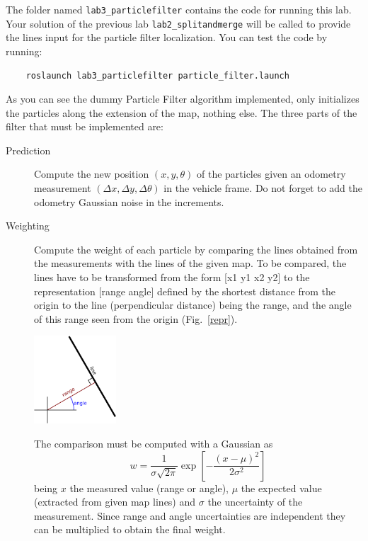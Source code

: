 \documentclass[a4paper,10pt]{article}
\begin{document}
The folder named \texttt{lab3\_particlefilter} contains the code for running this lab. Your solution of the previous lab \texttt{lab2\_splitandmerge} will be called to provide the lines input for the particle filter localization. You can test the code by running:

\begin{verbatim}
    roslaunch lab3_particlefilter particle_filter.launch
\end{verbatim}

As you can see the dummy Particle Filter algorithm implemented, only initializes the particles along the extension of the map, nothing else. The three parts of the filter that must be implemented are:

\begin{description}
    \item[Prediction] Compute the new position $(x, y, \theta)$ of the particles given an odometry measurement $(\Delta x, \Delta y, \Delta \theta )$ in the vehicle frame. Do not forget to add the odometry Gaussian noise in the increments.
    
    \item[Weighting] Compute the weight of each particle by comparing the lines obtained from the measurements with the lines of the given map. To be compared, the lines have to be transformed from the form [x1 y1 x2 y2] to the representation [range angle] defined by the shortest distance from the origin to the line (perpendicular distance) being the range, and the angle of this range seen from the origin (Fig.~\ref{repr}).
    
    \begin{center}
        \includegraphics[width=0.25\textwidth]{pict/lab3-repr}
        \label{repr}
    \end{center}
    
    The comparison must be computed with a Gaussian as
    \begin{equation}
        w = \frac{1}{\sigma \sqrt{2 \pi}} \exp \left[ - \frac{(x - \mu)^2}{2 \sigma^2} \right]
    \end{equation}
    being $x$ the measured value (range or angle), $\mu$ the expected value (extracted from given map lines) and $\sigma$ the uncertainty of the measurement. Since range and angle uncertainties are independent they can be multiplied to obtain the final weight.
    

\end{description}
\end{document}
